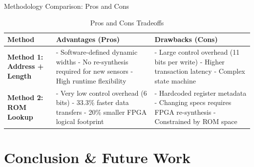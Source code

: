 \documentclass{beamer}
\begin{document}
\begin{frame}{Methodology Comparison: Pros and Cons}
  \begin{table}
    \centering\tiny
    \begin{tabular}{lp{4.2cm}p{4.2cm}}
      \toprule
      \textbf{Method} & \textbf{Advantages (Pros)} & \textbf{Drawbacks (Cons)} \\
      \midrule
      \textbf{Method 1: Address + Length} & 
        - Software-defined dynamic widths \newline
        - No re-synthesis required for new sensors \newline
        - High runtime flexibility & 
        - Large control overhead (11 bits per write) \newline
        - Higher transaction latency \newline
        - Complex state machine \\
      \midrule
      \textbf{Method 2: ROM Lookup} & 
        - Very low control overhead (6 bits) \newline
        - 33.3\% faster data transfers \newline
        - 20\% smaller FPGA logical footprint & 
        - Hardcoded register metadata \newline
        - Changing specs requires FPGA re-synthesis \newline
        - Constrained by ROM space \\
      \bottomrule
    \end{tabular}
    \caption{Pros and Cons Tradeoffs}
  \end{table}
\end{frame}

\section{Conclusion \& Future Work}
\end{document}
